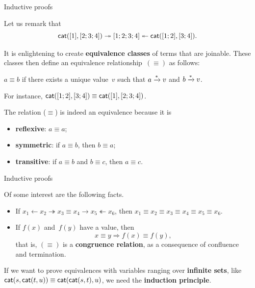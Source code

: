 %
\begin{frame}{Inductive proofs}

Let us remark that \[\textsf{cat}([1], [2;3;4]) \twoheadrightarrow
[1;2;3;4] \twoheadleftarrow \textsf{cat}([1;2], [3;4]).\]

\bigskip

It is enlightening to create \textbf{equivalence classes} of terms that
are joinable. These classes then define an equivalence
relationship~\((\equiv)\) as follows:
\begin{center}
  \(a \equiv b\) if there exists a unique value~\(v\) such that \(a
  \xrightarrow{\smash[t]{*}} v\) and \(b \xrightarrow{\smash{*}} v\).
\end{center}
For instance, \(\textsf{cat}([1;2], [3;4]) \equiv \textsf{cat}([1],
[2;3;4])\).

\bigskip

The relation (\(\equiv\)) is indeed an equivalence because it is
\begin{itemize}

  \item \textbf{reflexive}: \(a \equiv a\);

  \item \textbf{symmetric}: if \(a \equiv b\), then \(b \equiv a\);

  \item \textbf{transitive}: if \(a \equiv b\) and \(b \equiv c\), then
    \(a \equiv c\).

\end{itemize}

\end{frame}

%
\begin{frame}{Inductive proofs}

  Of some interest are the following facts.
  \begin{itemize}

    \item If \(x_1 \leftarrow x_2 \twoheadrightarrow x_3 \equiv x_4
      \rightarrow x_5 \twoheadleftarrow x_6\), then \(x_1 \equiv x_2
      \equiv x_3 \equiv x_4 \equiv x_5 \equiv x_6\).

    \item If \(f(x)\) and~\(f(y)\) have a value, then
      \[x \equiv y \Rightarrow f(x) \equiv f(y),\]
      that is, \((\equiv)\) is a \textbf{congruence relation}, as a
      consequence of confluence and termination.

  \end{itemize}

  If we want to prove equivalences with variables ranging over
  \textbf{infinite sets}, like \(\textsf{cat}(s,\textsf{cat}(t,u)) \equiv
  \textsf{cat}(\textsf{cat}(s,t),u)\), we need the \textbf{induction
    principle}.

\end{frame}

